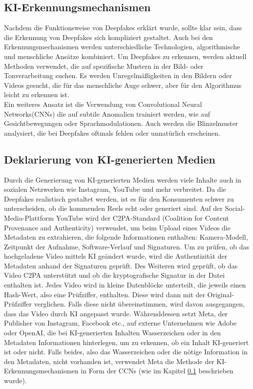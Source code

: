 \documentclass[a4paper,12pt]{article}
\begin{document}
\subsection{KI-Erkennungsmechanismen}\label{subsec:KI-Erkennungsmechanismen}
Nachdem die Funktionsweise von Deepfakes erklärt wurde, sollte klar sein,
dass die Erkennung von Deepfakes sich kompliziert gestaltet.
Auch bei den Erkennungsmechanismen werden unterschiedliche Technologien, algorithmische und menschliche Ansätze kombiniert.
Um Deepfakes zu erkennen, werden aktuell Methoden verwendet, die auf spezifische Mustern in der Bild- oder Tonverarbeitung suchen.
Es werden Unregelmäßigkeiten in den Bildern oder Videos gesucht, die für das menschliche Auge schwer,
aber für den Algorithmus leicht zu erkennen ist.\\
Ein weiteres Ansatz ist die Verwendung von Convolutional Neural Networks(CNNs)
die auf subtile Anomalien trainiert werden, wie auf Gesichtbewegungen oder Sprachmodulationen.
Auch werden die Blinzelmuster analysiert, die bei Deepfakes oftmals fehlen oder unnatürlich erscheinen.\cite{BVDW2024}

\subsection{Deklarierung von KI-generierten Medien}
Durch die Generierung von KI-generierten Medien werden viele Inhalte auch in sozialen Netzwerken wie Instagram, 
YouTube und mehr verbreitet. 
Da die Deepfakes realistisch gestaltet werden, 
ist es für den Konsumenten schwer zu unterscheiden, 
ob die kommenden Reels echt oder generiert sind.
Auf der Social-Media-Plattform YouTube wird der C2PA-Standard (Coalition for Content Provenance and Authenticity) verwendet, 
um beim Upload eines Videos die Metadaten zu extrahieren, 
die folgende Informationen enthalten: Kamera-Modell, 
Zeitpunkt der Aufnahme, Software-Verlauf und Signaturen. 
Um zu prüfen, ob das hochgeladene Video mittels KI geändert wurde, 
wird die Authentizität der Metadaten anhand der Signaturen geprüft. 
Des Weiteren wird geprüft, ob das Video C2PA unterstützt und ob die kryptografische Signatur in der Datei enthalten ist.
Jedes Video wird in kleine Datenblöcke unterteilt, 
die jeweils einen Hash-Wert, also eine Prüfziffer, 
enthalten. Diese wird dann mit der Original-Prüfziffer verglichen. 
Falls diese nicht übereinstimmen, wird davon ausgegangen, 
dass das Video durch KI angepasst wurde.\cite{TheVerge2024a}
Währenddessen setzt Meta, der Publisher von Instagram, Facebook etc., auf externe Unternehmen wie Adobe oder OpenAI,
die bei KI-generierten Inhalten Wasserzeichen oder in den Metadaten Informationen hinterlegen,
um zu erkennen, ob ein Inhalt KI-generiert ist oder nicht. Falls beides,
also das Wasserzeichen oder die nötige Information in den Metadaten,
nicht vorhanden ist, verwendet Meta die Methode der KI-Erkennungsmechanismen in Form der CCNs (wie im Kapitel \ref{subsec:KI-Erkennungsmechanismen} beschrieben wurde).\cite{TheVerge2024b}\cite{Meta2024}
\end{document}
